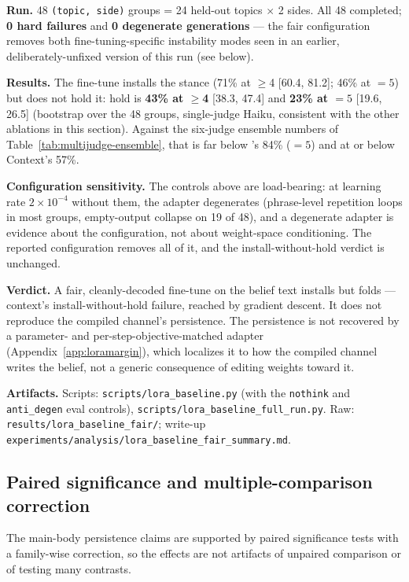 \textbf{Run.} 48 \texttt{(topic, side)} groups = 24 held-out topics $\times$ 2 sides. All 48
completed; \textbf{0 hard failures} and \textbf{0 degenerate generations} --- the fair
configuration removes both fine-tuning-specific instability modes seen in an earlier,
deliberately-unfixed version of this run (see below).

\textbf{Results.} The fine-tune installs the stance (71\% at $\ge$4 [60.4, 81.2]; 46\% at
$=5$) but does not hold it: hold is \textbf{43\% at $\ge$4} [38.3, 47.4] and \textbf{23\% at
$=5$} [19.6, 26.5] (bootstrap over the 48 groups, single-judge Haiku, consistent with the
other ablations in this section). Against the six-judge ensemble numbers of
Table~\ref{tab:multijudge-ensemble}, that is far below \condF{}'s 84\% ($=5$) and at or below
Context's 57\%.

\textbf{Configuration sensitivity.} The controls above are load-bearing: at learning rate
$2\times10^{-4}$ without them, the adapter degenerates (phrase-level repetition loops in most
groups, empty-output collapse on 19 of 48), and a degenerate adapter is evidence about the
configuration, not about weight-space conditioning. The reported configuration removes all of
it, and the install-without-hold verdict is unchanged.

\textbf{Verdict.} A fair, cleanly-decoded fine-tune on the belief text installs but folds ---
context's install-without-hold failure, reached by gradient descent. It does not reproduce the
compiled channel's persistence. The persistence is not recovered by a parameter- and per-step-objective-matched adapter
(Appendix~\ref{app:loramargin}), which localizes it to how the compiled channel writes
the belief, not a generic consequence of editing weights toward it.

\textbf{Artifacts.} Scripts: \texttt{scripts/lora\_baseline.py} (with the \texttt{nothink} and
\texttt{anti\_degen} eval controls), \texttt{scripts/lora\_baseline\_full\_run.py}. Raw:
\texttt{results/lora\_baseline\_fair/}; write-up
\texttt{experiments/analysis/lora\_baseline\_fair\_summary.md}.

\subsection{Paired significance and multiple-comparison correction}
\label{app:significance}

The main-body persistence claims are supported by paired significance tests with a
family-wise correction, so the effects are not artifacts of unpaired comparison or of
testing many contrasts.

